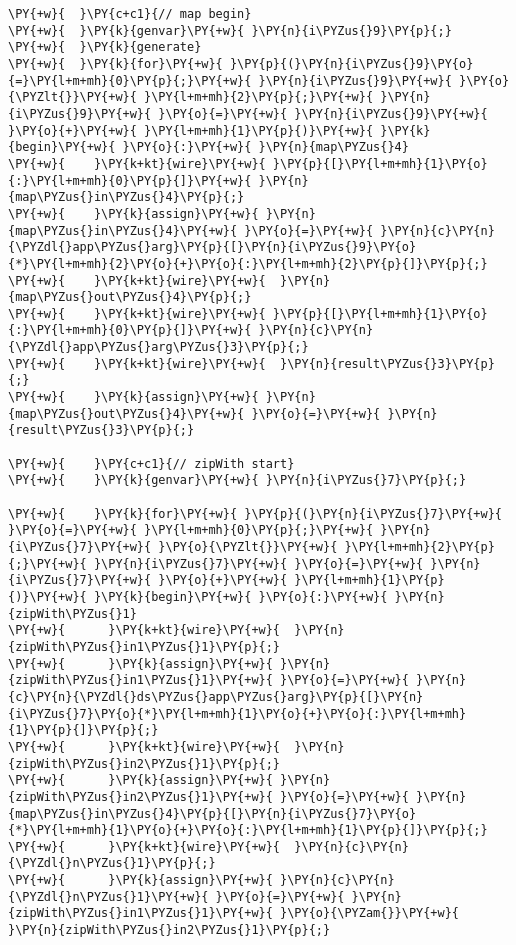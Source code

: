 {\begin{Verbatim}[commandchars=\\\{\}]
\PY{+w}{  }\PY{c+c1}{// map begin}
\PY{+w}{  }\PY{k}{genvar}\PY{+w}{ }\PY{n}{i\PYZus{}9}\PY{p}{;}
\PY{+w}{  }\PY{k}{generate}
\PY{+w}{  }\PY{k}{for}\PY{+w}{ }\PY{p}{(}\PY{n}{i\PYZus{}9}\PY{o}{=}\PY{l+m+mh}{0}\PY{p}{;}\PY{+w}{ }\PY{n}{i\PYZus{}9}\PY{+w}{ }\PY{o}{\PYZlt{}}\PY{+w}{ }\PY{l+m+mh}{2}\PY{p}{;}\PY{+w}{ }\PY{n}{i\PYZus{}9}\PY{+w}{ }\PY{o}{=}\PY{+w}{ }\PY{n}{i\PYZus{}9}\PY{+w}{ }\PY{o}{+}\PY{+w}{ }\PY{l+m+mh}{1}\PY{p}{)}\PY{+w}{ }\PY{k}{begin}\PY{+w}{ }\PY{o}{:}\PY{+w}{ }\PY{n}{map\PYZus{}4}
\PY{+w}{    }\PY{k+kt}{wire}\PY{+w}{ }\PY{p}{[}\PY{l+m+mh}{1}\PY{o}{:}\PY{l+m+mh}{0}\PY{p}{]}\PY{+w}{ }\PY{n}{map\PYZus{}in\PYZus{}4}\PY{p}{;}
\PY{+w}{    }\PY{k}{assign}\PY{+w}{ }\PY{n}{map\PYZus{}in\PYZus{}4}\PY{+w}{ }\PY{o}{=}\PY{+w}{ }\PY{n}{c}\PY{n}{\PYZdl{}app\PYZus{}arg}\PY{p}{[}\PY{n}{i\PYZus{}9}\PY{o}{*}\PY{l+m+mh}{2}\PY{o}{+}\PY{o}{:}\PY{l+m+mh}{2}\PY{p}{]}\PY{p}{;}
\PY{+w}{    }\PY{k+kt}{wire}\PY{+w}{  }\PY{n}{map\PYZus{}out\PYZus{}4}\PY{p}{;}
\PY{+w}{    }\PY{k+kt}{wire}\PY{+w}{ }\PY{p}{[}\PY{l+m+mh}{1}\PY{o}{:}\PY{l+m+mh}{0}\PY{p}{]}\PY{+w}{ }\PY{n}{c}\PY{n}{\PYZdl{}app\PYZus{}arg\PYZus{}3}\PY{p}{;}
\PY{+w}{    }\PY{k+kt}{wire}\PY{+w}{  }\PY{n}{result\PYZus{}3}\PY{p}{;}
\PY{+w}{    }\PY{k}{assign}\PY{+w}{ }\PY{n}{map\PYZus{}out\PYZus{}4}\PY{+w}{ }\PY{o}{=}\PY{+w}{ }\PY{n}{result\PYZus{}3}\PY{p}{;}

\PY{+w}{    }\PY{c+c1}{// zipWith start}
\PY{+w}{    }\PY{k}{genvar}\PY{+w}{ }\PY{n}{i\PYZus{}7}\PY{p}{;}

\PY{+w}{    }\PY{k}{for}\PY{+w}{ }\PY{p}{(}\PY{n}{i\PYZus{}7}\PY{+w}{ }\PY{o}{=}\PY{+w}{ }\PY{l+m+mh}{0}\PY{p}{;}\PY{+w}{ }\PY{n}{i\PYZus{}7}\PY{+w}{ }\PY{o}{\PYZlt{}}\PY{+w}{ }\PY{l+m+mh}{2}\PY{p}{;}\PY{+w}{ }\PY{n}{i\PYZus{}7}\PY{+w}{ }\PY{o}{=}\PY{+w}{ }\PY{n}{i\PYZus{}7}\PY{+w}{ }\PY{o}{+}\PY{+w}{ }\PY{l+m+mh}{1}\PY{p}{)}\PY{+w}{ }\PY{k}{begin}\PY{+w}{ }\PY{o}{:}\PY{+w}{ }\PY{n}{zipWith\PYZus{}1}
\PY{+w}{      }\PY{k+kt}{wire}\PY{+w}{  }\PY{n}{zipWith\PYZus{}in1\PYZus{}1}\PY{p}{;}
\PY{+w}{      }\PY{k}{assign}\PY{+w}{ }\PY{n}{zipWith\PYZus{}in1\PYZus{}1}\PY{+w}{ }\PY{o}{=}\PY{+w}{ }\PY{n}{c}\PY{n}{\PYZdl{}ds\PYZus{}app\PYZus{}arg}\PY{p}{[}\PY{n}{i\PYZus{}7}\PY{o}{*}\PY{l+m+mh}{1}\PY{o}{+}\PY{o}{:}\PY{l+m+mh}{1}\PY{p}{]}\PY{p}{;}
\PY{+w}{      }\PY{k+kt}{wire}\PY{+w}{  }\PY{n}{zipWith\PYZus{}in2\PYZus{}1}\PY{p}{;}
\PY{+w}{      }\PY{k}{assign}\PY{+w}{ }\PY{n}{zipWith\PYZus{}in2\PYZus{}1}\PY{+w}{ }\PY{o}{=}\PY{+w}{ }\PY{n}{map\PYZus{}in\PYZus{}4}\PY{p}{[}\PY{n}{i\PYZus{}7}\PY{o}{*}\PY{l+m+mh}{1}\PY{o}{+}\PY{o}{:}\PY{l+m+mh}{1}\PY{p}{]}\PY{p}{;}
\PY{+w}{      }\PY{k+kt}{wire}\PY{+w}{  }\PY{n}{c}\PY{n}{\PYZdl{}n\PYZus{}1}\PY{p}{;}
\PY{+w}{      }\PY{k}{assign}\PY{+w}{ }\PY{n}{c}\PY{n}{\PYZdl{}n\PYZus{}1}\PY{+w}{ }\PY{o}{=}\PY{+w}{ }\PY{n}{zipWith\PYZus{}in1\PYZus{}1}\PY{+w}{ }\PY{o}{\PYZam{}}\PY{+w}{ }\PY{n}{zipWith\PYZus{}in2\PYZus{}1}\PY{p}{;}



\end{Verbatim}}
